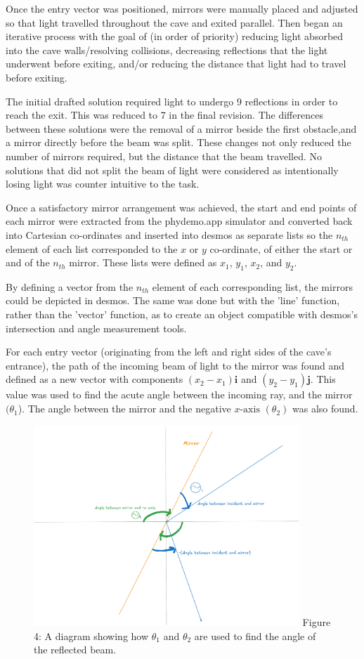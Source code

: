 \documentclass[11pt, letterpaper]{article}
\begin{document}
Once the entry vector was positioned, mirrors were manually placed and adjusted so that light travelled throughout the cave and exited parallel. Then began an iterative process with the goal of (in order of priority) reducing light absorbed into the cave walls/resolving collisions, decreasing reflections that the light underwent before exiting, and/or reducing the distance that light had to travel before exiting. 


The initial drafted solution required light to undergo 9 reflections in order to reach the exit. This was reduced to 7 in the final revision. The differences between these solutions were the removal of a mirror beside the first obstacle,and a mirror directly before the beam was split. These changes not only reduced the number of mirrors required, but the distance that the beam travelled. No solutions that did not split the beam of light were considered as intentionally losing light was counter intuitive to the task.


Once a satisfactory mirror arrangement was achieved, the start and end points of each mirror were extracted from the phydemo.app simulator and converted back into Cartesian co-ordinates and inserted into desmos as separate lists so the $n_{th}$ element of each list corresponded to the $x$ or $y$ co-ordinate, of either the start or and of the $n_{th}$ mirror. These lists were defined as $x_1$, $y_1$, $x_2$, and $y_2$.

 By defining a vector from the $n_{th}$ element of each corresponding list, the mirrors could be depicted in desmos. The same was done but with the 'line' function, rather than the 'vector' function, as to create an object compatible with desmos's intersection and angle measurement tools.

For each entry vector (originating from the left and right sides of the cave's entrance), the path of the incoming beam of light to the mirror was found and defined as a new vector with components $(x_2 - x_1)\textbf{i}$ and $(y_2 - y_1)\textbf{j}$. This value was used to find the acute angle between the incoming ray, and the mirror $(\theta _1$). The angle between the mirror and the negative $x\textrm{-axis}$ $(\theta _2)$ was also found.
\pagebreak
\newline
\begin{figure}
\includegraphics[width=10cm]{Diagram 6.png}
Figure 4: A diagram showing how $\theta _1$ and $\theta _2$ are used to find the angle of the reflected beam.
\end{figure}
\end{document}
